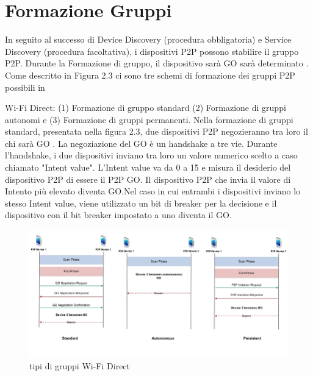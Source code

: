 \section{Formazione Gruppi}

In seguito al successo di Device Discovery (procedura obbligatoria) e
Service Discovery (procedura facoltativa), i dispositivi P2P  possono
stabilire il gruppo P2P. Durante la Formazione di gruppo, il dispositivo
sarà GO sarà determinato . Come descritto in Figura 2.3 ci sono
tre schemi di formazione dei gruppi P2P possibili in

Wi-Fi Direct: (1) Formazione di gruppo standard (2) Formazione di
gruppi autonomi e (3) Formazione di gruppi permanenti. Nella formazione
di gruppi standard, presentata nella figura 2.3,  due dispositivi P2P
negozieranno
tra loro il chi sarà GO . La negoziazione del GO è un handshake a
tre vie. Durante l'handshake, i due dispositivi inviano tra loro un valore
numerico scelto a caso chiamato "Intent value". L'Intent value
va da 0 a 15 e misura il desiderio del dispositivo P2P di essere il P2P
GO. Il dispositivo P2P che invia il valore di Intento più elevato
diventa GO.Nel caso in cui entrambi i dispositivi inviano
lo stesso Intent value, viene utilizzato
un bit di breaker per la decisione e il dispositivo con il bit breaker  
impostato a uno diventa il GO.

\begin{figure}
\caption{tipi di gruppi Wi-Fi Direct}
\includegraphics[width=1\columnwidth]{imgs/wifiGroup.jpg} %
\end{figure}


